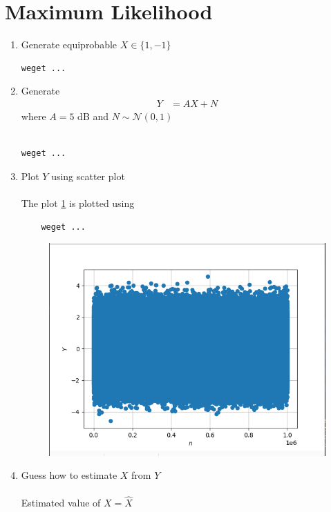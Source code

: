 \documentclass[journal,12pt,twocolumn]{IEEEtran}
\renewcommand\thesection{\arabic{section}}
\begin{document}
\section{Maximum Likelihood}
\begin{enumerate}[label=\thesection.\arabic*
    ,ref=\thesection.\theenumi]
\item Generate equiprobable $X \in \{1, -1\}$\\
\solution
\begin{lstlisting}
weget ...
\end{lstlisting}
\item Generate 
\begin{align}
    Y &= AX + N
\end{align}
where $A = 5$ dB and $N \sim \mathcal{N}(0,1)$\\
\solution\\
\begin{lstlisting}
weget ...
\end{lstlisting}
\item Plot $Y$ using scatter plot\\
\solution\\
The plot \ref*{fig:scatter_y} is plotted using
\begin{lstlisting}
    weget ...
\end{lstlisting}
\begin{figure}
    \centering
    \includegraphics[width=\columnwidth]{./figs/scatter.png}
    \label{fig:scatter_y}
\end{figure}
\item Guess how to estimate $X$ from $Y$\\
\solution\\
Estimated value of $X = \hat{X}$


\end{enumerate}
\end{document}

